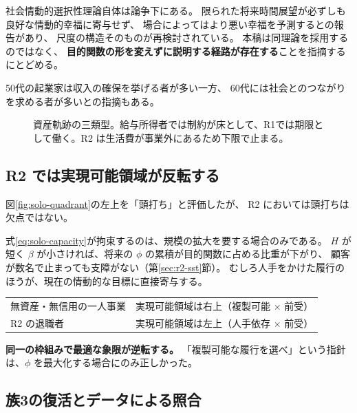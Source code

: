 \begin{remark}[同理論の現状]
社会情動的選択性理論自体は論争下にある。
限られた将来時間展望が必ずしも良好な情動的幸福に寄与せず、
場合によってはより悪い幸福を予測するとの報告があり、
尺度の構造そのものが再検討されている。
本稿は同理論を採用するのではなく、
\textbf{目的関数の形を変えずに説明する経路が存在する}ことを指摘するにとどめる。
\end{remark}
50代の起業家は収入の確保を挙げる者が多い一方、
60代には社会とのつながりを求める者が多いとの指摘もある。

\begin{figure}[htbp]
\centering
{}
\caption{資産軌跡の三類型。給与所得者では制約が床として、R1では期限として働く。R2 は生活費が事業外にあるため下限で止まる。}
\label{fig:trajectory}
\end{figure}

\subsection{R2 では実現可能領域が反転する}

図\ref{fig:solo-quadrant}の左上を「頭打ち」と評価したが、
R2 においては頭打ちは欠点ではない。

式\eqref{eq:solo-capacity}が拘束するのは、規模の拡大を要する場合のみである。
$H$ が短く $\beta$ が小さければ、将来の $\phi$ の累積が目的関数に占める比重が下がり、
顧客が数名で止まっても支障がない（第\ref{sec:r2-sst}節）。
むしろ人手をかけた履行のほうが、現在の情動的な目標に直接寄与する。

\begin{center}
\begin{tabularx}{\textwidth}{@{}lX@{}}
\toprule
無資産・無信用の一人事業 & 実現可能領域は右上（複製可能 $\times$ 前受） \\
R2 の退職者 & 実現可能領域は左上（人手依存 $\times$ 前受） \\
\bottomrule
\end{tabularx}
\label{tab:solo-quadrant-comparison}
\end{center}

\textbf{同一の枠組みで最適な象限が逆転する。}
「複製可能な履行を選べ」という指針は、$\phi$ を最大化する場合にのみ正しかった。

\subsection{族3の復活とデータによる照合}

